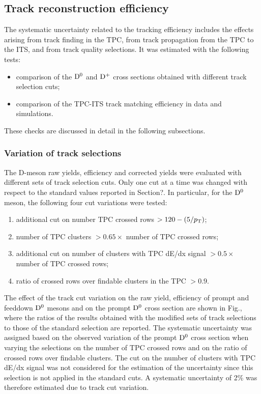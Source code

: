\subsection{Track reconstruction efficiency}

The systematic uncertainty related to the tracking efficiency includes the 
effects arising from track finding in the TPC, from track propagation  
from the TPC to the ITS, and from track quality selections.
It was estimated with the following tests:
\begin{itemize}
\item comparison of the ${\rm D^0}$ and ${\rm D^+}$ cross sections obtained with different track selection cuts;
\item comparison of the TPC-ITS track matching efficiency in data and simulations.
\end{itemize}
These checks are discussed in detail in the following subsections.

\subsubsection{Variation of track selections}

The D-meson raw yields, efficiency and corrected yields were evaluated with 
different sets of track selection cuts.
Only one cut at a time was changed with respect to the standard values 
reported in Section?.
In particular, for the ${\rm D^0}$ meson, the following four cut variations were 
tested:
\begin{enumerate}
\item additional cut on number TPC crossed rows $> 120-(5/p_{\rm T})$;
\item number of TPC clusters $>0.65 \times$ number of TPC crossed rows;
\item additional cut on number of clusters with TPC dE/dx signal $> 0.5 \times$ number of TPC crossed rows;
\item ratio of crossed rows over findable clusters in the TPC $>0.9$.
\end{enumerate}

The effect of the track cut variation on the raw yield, efficiency 
of prompt and feeddown ${\rm D^0}$ mesons and on the prompt ${\rm D^0}$ 
cross section are shown in Fig., where the ratios of 
the results obtained with the modified sets of track selections to those of 
the standard selection are reported.
The systematic uncertainty was assigned based on the observed variation of
the prompt ${\rm D^0}$ cross section when varying the selections on the number of
TPC crossed rows and on the ratio of crossed rows over findable clusters.
The cut on the number of clusters with TPC dE/dx signal was not considered
for the estimation of the uncertainty since this selection is not applied
in the standard cuts.
 A systematic uncertainty of 2\% was therefore estimated due to track cut
variation.



